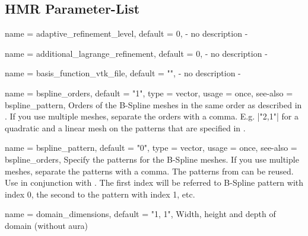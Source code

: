 \subsection{HMR Parameter-List}

\begin{parameter}{
    name    = {adaptive_refinement_level},
    default = {0},
}
- no description -
\end{parameter}

\begin{parameter}{
    name    = {additional_lagrange_refinement},
    default = {0},
}
- no description -
\end{parameter}

\begin{parameter}{
    name    = {basis_function_vtk_file},
    default = {""},
}
- no description -
\end{parameter}

\begin{parameter}{
    name    = {bspline_orders},
    default = {"1"},
    type    = {vector},
    usage   = {once},
    see-also = {bspline_pattern},
}
Orders of the B-Spline meshes in the same order as described in .
If you use multiple meshes, separate the orders with a comma.
E.g. |"2,1"| for a quadratic and a linear mesh on the patterns that are specified in .
\end{parameter}

\begin{parameter}{
    name    = {bspline_pattern},
    default = {"0"},
    type    = {vector},
    usage   = {once},
    see-also = {bspline_orders},
}
Specify the patterns for the B-Spline meshes.
If you use multiple meshes, separate the patterns with a comma.
The patterns from  can be reused.
Use in conjunction with .
The first index will be referred to B-Spline pattern with index 0, the second to the pattern with index 1, etc.
\end{parameter}

\begin{parameter}{
    name    = {domain_dimensions},
    default = {"1, 1"},
}
Width, height and depth of domain (without aura)
\end{parameter}

